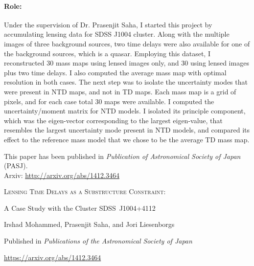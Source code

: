 \documentclass[
  11pt,
  twoside,
  openright,
  titlepage,
  headings=optiontoheadandtoc
]{scrbook}
\begin{document}
\paragraph{Role:} Under the supervision of Dr. Prasenjit Saha, I started this project
by accumulating lensing data for SDSS J1004 cluster. Along with the multiple
images of three background sources, two time delays were also available for one 
of the background sources, which is a quasar. Employing this dataset, I reconstructed
30 mass maps using lensed images only, and 30 using lensed images plus two time
delays. I also computed the average mass map with optimal resolution in both
cases. The next step was to isolate the uncertainty modes that were present
in NTD maps, and not in TD maps. Each mass map is a grid of pixels, and for each
case total 30 maps were available. 
I computed the uncertainty/moment matrix for NTD models.
I isolated its principle component, which was the eigen-vector corresponding
to the largest eigen-value, that resembles the largest uncertainty
mode present in NTD models, and compared its effect to the reference 
mass model that we chose to be the average TD mass map. 

This paper has been published in {\it Publication of Astronomical Society of Japan} (PASJ). 
\\
Arxiv: \url{http://arxiv.org/abs/1412.3464}

\begin{publishedpaper}
  {\fontsize{18}{22}\selectfont\scshape
   Lensing Time Delays as a Substructure Constraint:\par
   A Case Study with the Cluster SDSS~J1004+4112\par}

  \vspace{1.25em}

  {\large
   Irshad Mohammed, Prasenjit Saha, and Jori Liesenborgs\par}

  \vspace{1.25em}
  {\small
   Published in \textit{Publications of the Astronomical Society of Japan}\par
   \url{https://arxiv.org/abs/1412.3464}\par}
\end{publishedpaper}
\end{document}
